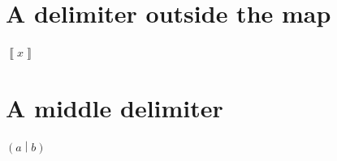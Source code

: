 \documentclass{article}
\begin{document}
\section{A delimiter outside the map}
$\left\llbracket x \right\rrbracket$

\section{A middle delimiter}
$\left(a\middle|b\right)$

\end{document}
